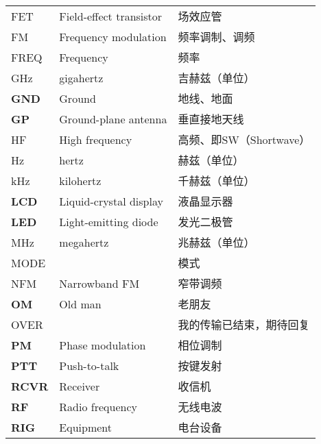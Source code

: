 \begin{longtable}[l]{lll}
  FET            & Field-effect transistor              & 场效应管                \\
  FM             & Frequency modulation                 & 频率调制、调频             \\
  FREQ           & Frequency                            & 频率                  \\
  \unit{\GHz}      & gigahertz                            & 吉赫兹（单位）             \\
  \textbf{GND}   & Ground                               & 地线、地面               \\
  \textbf{GP}    & Ground-plane antenna                 & 垂直接地天线              \\
  HF             & High frequency                       & 高频、即SW（Shortwave）   \\
  Hz             & hertz                                & 赫兹（单位）              \\
  \unit{\kHz}      & kilohertz                            & 千赫兹（单位）             \\
  \textbf{LCD}   & Liquid-crystal display               & 液晶显示器               \\
  \textbf{LED}   & Light-emitting diode                 & 发光二极管               \\
  \unit{\MHz}      & megahertz                            & 兆赫兹（单位）             \\
  MODE           &                                      & 模式                  \\
  NFM            & Narrowband FM                        & 窄带调频                \\
  \textbf{OM}    & Old man                              & 老朋友                 \\%
  OVER           &                                      & 我的传输已结束，期待回复        \\
  \textbf{PM}    & Phase modulation                     & 相位调制                \\
  \textbf{PTT}   & Push-to-talk                         & 按键发射                \\
  \textbf{RCVR}  & Receiver                             & 收信机                 \\
  \textbf{RF}    & Radio frequency                      & 无线电波                \\
  \textbf{RIG}   & Equipment                            & 电台设备                \\

\end{longtable}
